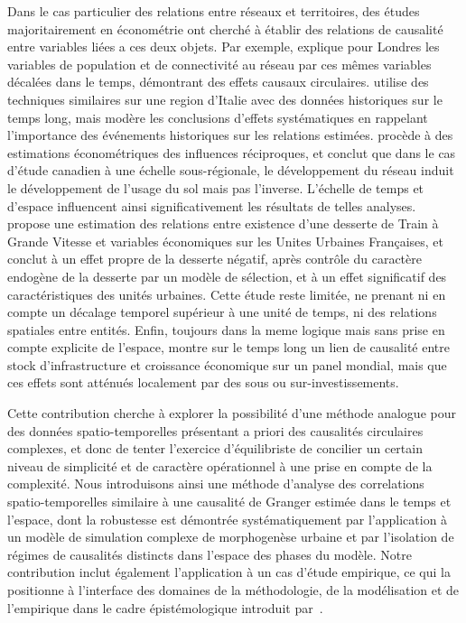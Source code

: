 \documentclass[english]{./sageo}
\begin{document}
Dans le cas particulier des relations entre réseaux et territoires, des études majoritairement en économétrie ont cherché à établir des relations de causalité entre variables liées a ces deux objets. Par exemple, \cite{levinson2008density} explique pour Londres les variables de population et de connectivité au réseau par ces mêmes variables décalées dans le temps, démontrant des effets causaux circulaires. \cite{doi10.1068/b39089} utilise des techniques similaires sur une region d'Italie avec des données historiques sur le temps long, mais modère les conclusions d'effets systématiques en rappelant l'importance des événements historiques sur les relations estimées. \cite{cuthbert2005empirical} procède à des estimations économétriques des influences réciproques, et conclut que dans le cas d'étude canadien à une échelle sous-régionale, le développement du réseau induit le développement de l'usage du sol mais pas l'inverse. L'échelle de temps et d'espace influencent ainsi significativement les résultats de telles analyses. \cite{koninghal-00962384} propose une estimation des relations entre existence d'une desserte de Train à Grande Vitesse et variables économiques sur les Unites Urbaines Françaises, et conclut à un effet propre de la desserte négatif, après contrôle du caractère endogène de la desserte par un modèle de sélection, et à un effet significatif des caractéristiques des unités urbaines. Cette étude reste limitée, ne prenant ni en compte un décalage temporel supérieur à une unité de temps, ni des relations spatiales entre entités. Enfin, toujours dans la meme logique mais sans prise en compte explicite de l'espace, \cite{MANCMANC1073} montre sur le temps long un lien de causalité entre stock d'infrastructure et croissance économique sur un panel mondial, mais que ces effets sont atténués localement par des sous ou sur-investissements.



Cette contribution cherche à explorer la possibilité d'une méthode analogue pour des données spatio-temporelles présentant a priori des causalités circulaires complexes, et donc de tenter l'exercice d'équilibriste de concilier un certain niveau de simplicité et de caractère opérationnel à une prise en compte de la complexité. Nous introduisons ainsi une méthode d'analyse des correlations spatio-temporelles similaire à une causalité de Granger estimée dans le temps et l'espace, dont la robustesse est démontrée systématiquement par l'application à un modèle de simulation complexe de morphogenèse urbaine et par l'isolation de régimes de causalités distincts dans l'espace des phases du modèle. Notre contribution inclut également l'application à un cas d'étude empirique, ce qui la positionne à l'interface des domaines de la méthodologie, de la modélisation et de l'empirique dans le cadre épistémologique introduit par~\cite{2017arXiv170609244R}.
\end{document}
